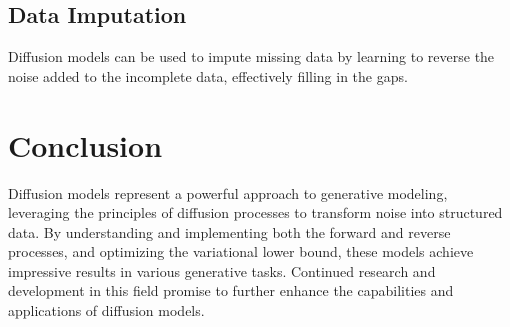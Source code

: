 \subsection{Data Imputation}
Diffusion models can be used to impute missing data by learning to reverse the noise added to the incomplete data, effectively filling in the gaps.

\section{Conclusion}
Diffusion models represent a powerful approach to generative modeling, leveraging the principles of diffusion processes to transform noise into structured data. By understanding and implementing both the forward and reverse processes, and optimizing the variational lower bound, these models achieve impressive results in various generative tasks. Continued research and development in this field promise to further enhance the capabilities and applications of diffusion models.


